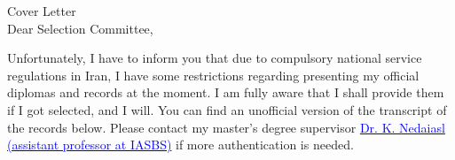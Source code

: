 \begin{cSection}{Cover Letter}
	\\	
	\vspace*{1em}
	\small
Dear Selection Committee, \vspace*{0.5em}

Unfortunately, I have to inform you that due to compulsory national service regulations in Iran, I have some restrictions regarding presenting my official diplomas and records at the moment. I am fully aware that I shall provide them if I got selected, and I will. You can find an unofficial version of the transcript of the records below. Please contact my master's degree supervisor \href{https://iasbs.ac.ir/personalpage?id=31016&staff=0}{\textcolor{blue}{Dr. K. Nedaiasl (assistant professor at IASBS)}} if more authentication is needed.




\end{cSection}
